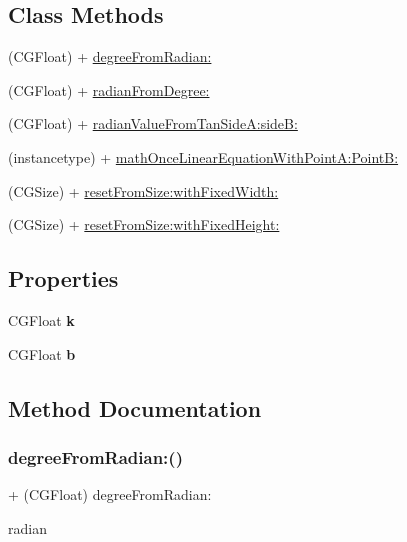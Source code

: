 \subsection*{Class Methods}
\begin{DoxyCompactItemize}
\item 
(C\+G\+Float) + \mbox{\hyperlink{interface_math_a678c4164443172c43a9d0a605e32b3c6}{degree\+From\+Radian\+:}}
\item 
(C\+G\+Float) + \mbox{\hyperlink{interface_math_adf1aa152458ba4692009473c03eb70b0}{radian\+From\+Degree\+:}}
\item 
(C\+G\+Float) + \mbox{\hyperlink{interface_math_a04cef0783d331a3cbe848d7e56b5b38e}{radian\+Value\+From\+Tan\+Side\+A\+:side\+B\+:}}
\item 
(instancetype) + \mbox{\hyperlink{interface_math_a94d76076860ab2c7810202761246f557}{math\+Once\+Linear\+Equation\+With\+Point\+A\+:\+Point\+B\+:}}
\item 
(C\+G\+Size) + \mbox{\hyperlink{interface_math_ab968ff10f3cf143ebbd8f6c5cf9c196a}{reset\+From\+Size\+:with\+Fixed\+Width\+:}}
\item 
(C\+G\+Size) + \mbox{\hyperlink{interface_math_a12894523c500bdb28f33b5b20a8f3666}{reset\+From\+Size\+:with\+Fixed\+Height\+:}}
\end{DoxyCompactItemize}
\subsection*{Properties}
\begin{DoxyCompactItemize}
\item 
\mbox{\label{interface_math_a9ed455c2a6f5596c795579d7e1fd205e}} 
C\+G\+Float {\bfseries k}
\item 
\mbox{\label{interface_math_aef416ce65ff5e9ee6d2fc319720781fa}} 
C\+G\+Float {\bfseries b}
\end{DoxyCompactItemize}


\subsection{Method Documentation}
\mbox{\label{interface_math_a678c4164443172c43a9d0a605e32b3c6}} 
\subsubsection{\texorpdfstring{degree\+From\+Radian\+:()}{degreeFromRadian:()}}
{\footnotesize\ttfamily + (C\+G\+Float) degree\+From\+Radian\+: \begin{DoxyParamCaption}\item[{(C\+G\+Float)}]{radian }\end{DoxyParamCaption}}

